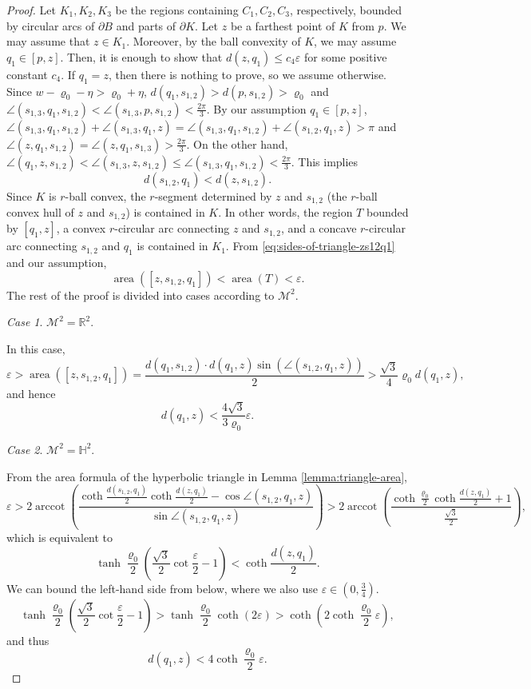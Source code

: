 \documentclass[12pt,reqno]{amsart}
\theoremstyle{remark}
\newtheorem{case}{Case}
\newcommand{\R}{{\mathbb R}}
\newcommand{\hyp}{{\mathbb H}}
\newcommand{\M}{\mathcal{M}}
\DeclareMathOperator{\arccot}{\mathrm{arccot}}
\DeclareMathOperator{\area}{\mathrm{area}}
\begin{document}
\begin{proof}
Let $K_1,K_2,K_3$ be the regions containing $C_1,C_2,C_3$, respectively, bounded by circular arcs of $\partial B$ and parts of $\partial K$. Let $z$ be a farthest point of $K$ from $p$. We may assume that $z\in K_1$. Moreover, by the ball convexity of $K$, we may assume $q_1\in[p,z]$. Then, it is enough to show that $d(z,q_1)\leq c_4\varepsilon$ for some positive constant $c_4$. If $q_1=z$, then there is nothing to prove, so we assume otherwise. Since $w-\varrho_0-\eta>\varrho_0+\eta$, $d(q_1,s_{1,2})>d(p,s_{1,2})>\varrho_0$ and $\angle(s_{1,3},q_1,s_{1,2})<\angle(s_{1,3},p,s_{1,2})<\frac{2\pi}{3}$. By our assumption $q_1\in[p,z]$, $\angle(s_{1,3},q_1,s_{1,2})+\angle(s_{1,3},q_1,z)=\angle(s_{1,3},q_1,s_{1,2})+\angle(s_{1,2},q_1,z)>\pi$ and $\angle(z,q_1,s_{1,2})=\angle(z,q_1,s_{1,3})>\frac{2\pi}{3}$. On the other hand, $\angle(q_1,z,s_{1,2})<\angle(s_{1,3},z,s_{1,2})\leq\angle(s_{1,3},q_1,s_{1,2})<\frac{2\pi}{3}$. This implies
\begin{equation}\label{eq:sides-of-triangle-zs12q1}
d(s_{1,2},q_1)<d(z,s_{1,2}).
\end{equation}
Since $K$ is $r$-ball convex, the $r$-segment determined by $z$ and $s_{1,2}$ (the $r$-ball convex hull of $z$ and $s_{1,2}$) is contained in $K$. In other words, the region $T$ bounded by $[q_1,z]$, a convex $r$-circular arc connecting $z$ and $s_{1,2}$, and a concave $r$-circular arc connecting $s_{1,2}$ and $q_1$ is contained in $K_1$. From \eqref{eq:sides-of-triangle-zs12q1} and our assumption,
\begin{equation}
\area([z,s_{1,2},q_1])<\area(T)<\varepsilon.
\end{equation}
The rest of the proof is divided into cases according to $\M^2$.

\setcounter{case}{0}
\begin{case}
    $\M^2=\R^2$.
\end{case}

In this case,
\[
\varepsilon>\area([z,s_{1,2},q_1])=\frac{d(q_1,s_{1,2})\cdot d(q_1,z)\sin(\angle(s_{1,2},q_1,z))}{2}>\frac{\sqrt{3}}{4}\varrho_0 d(q_1,z),
\]
and hence
\[
d(q_1,z)<\frac{4\sqrt{3}}{3\varrho_0}\varepsilon.
\]

\begin{case}
    $\M^2=\hyp^2$.
\end{case}

From the area formula of the hyperbolic triangle in Lemma \ref{lemma:triangle-area},
\[
\varepsilon>2\arccot\left(\frac{\coth\frac{d(s_{1,2},q_1)}{2}\coth\frac{d(z,q_1)}{2}-\cos\angle(s_{1,2},q_1,z)}{\sin\angle(s_{1,2},q_1,z)}\right)>2\arccot\left(\frac{\coth\frac{\varrho_0}{2}\coth\frac{d(z,q_1)}{2}+1}{\frac{\sqrt{3}}{2}}\right),
\]
which is equivalent to
\[
\tanh\frac{\varrho_0}{2}\left(\frac{\sqrt{3}}{2}\cot\frac{\varepsilon}{2}-1\right)<\coth\frac{d(z,q_1)}{2}.
\]
We can bound the left-hand side from below, where we also use $\varepsilon\in\left(0,\frac{3}{4}\right)$.
\[
\tanh\frac{\varrho_0}{2}\left(\frac{\sqrt{3}}{2}\cot\frac{\varepsilon}{2}-1\right)>\tanh\frac{\varrho_0}{2}\coth(2\varepsilon)>\coth\left(2\coth\frac{\varrho_0}{2}\varepsilon\right),
\]
and thus
\[
d(q_1,z)<4\coth\frac{\varrho_0}{2}\varepsilon.
\]


\end{proof}
\end{document}
